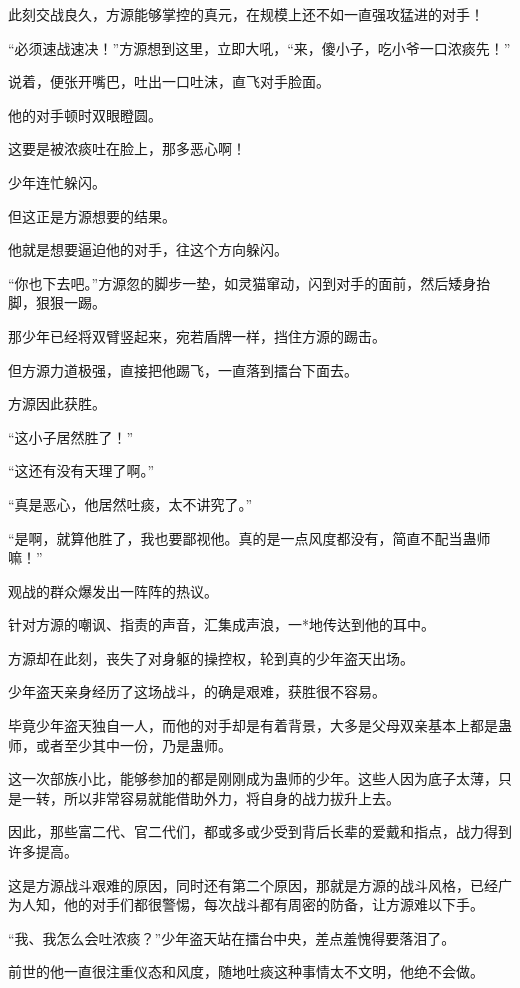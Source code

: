 \begin{this_body}
此刻交战良久，方源能够掌控的真元，在规模上还不如一直强攻猛进的对手！

“必须速战速决！”方源想到这里，立即大吼，“来，傻小子，吃小爷一口浓痰先！”

说着，便张开嘴巴，吐出一口吐沫，直飞对手脸面。

他的对手顿时双眼瞪圆。

这要是被浓痰吐在脸上，那多恶心啊！

少年连忙躲闪。

但这正是方源想要的结果。

他就是想要逼迫他的对手，往这个方向躲闪。

“你也下去吧。”方源忽的脚步一垫，如灵猫窜动，闪到对手的面前，然后矮身抬脚，狠狠一踢。

那少年已经将双臂竖起来，宛若盾牌一样，挡住方源的踢击。

但方源力道极强，直接把他踢飞，一直落到擂台下面去。

方源因此获胜。

“这小子居然胜了！”

“这还有没有天理了啊。”

“真是恶心，他居然吐痰，太不讲究了。”

“是啊，就算他胜了，我也要鄙视他。真的是一点风度都没有，简直不配当蛊师嘛！”

观战的群众爆发出一阵阵的热议。

针对方源的嘲讽、指责的声音，汇集成声浪，一*地传达到他的耳中。

方源却在此刻，丧失了对身躯的操控权，轮到真的少年盗天出场。

少年盗天亲身经历了这场战斗，的确是艰难，获胜很不容易。

毕竟少年盗天独自一人，而他的对手却是有着背景，大多是父母双亲基本上都是蛊师，或者至少其中一份，乃是蛊师。

这一次部族小比，能够参加的都是刚刚成为蛊师的少年。这些人因为底子太薄，只是一转，所以非常容易就能借助外力，将自身的战力拔升上去。

因此，那些富二代、官二代们，都或多或少受到背后长辈的爱戴和指点，战力得到许多提高。

这是方源战斗艰难的原因，同时还有第二个原因，那就是方源的战斗风格，已经广为人知，他的对手们都很警惕，每次战斗都有周密的防备，让方源难以下手。

“我、我怎么会吐浓痰？”少年盗天站在擂台中央，差点羞愧得要落泪了。

前世的他一直很注重仪态和风度，随地吐痰这种事情太不文明，他绝不会做。


\end{this_body}

